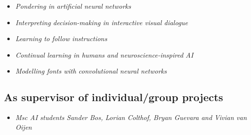 {{{{{{{
{\begin{itemize}
  \item[] \textit{Pondering in artificial neural networks}
\end{itemize}}}

{
{\begin{itemize}
  \item[] \textit{Interpreting decision-making in interactive visual dialogue}
\end{itemize}}}

{
{\begin{itemize}
  \item[] \textit{Learning to follow instructions}
\end{itemize}}}

{
{\begin{itemize}
  \item[] \textit{Continual learning in humans and neuroscience-inspired AI}
\end{itemize}}}

{
{\begin{itemize}
  \item[] \textit{Modelling fonts with convolutional neural networks}
\end{itemize}}}

\vspace{1mm}

\subsection{As supervisor of individual/group projects}
{
{\begin{itemize}
  \item[] \textit{Msc AI students Sander Bos, Lorian Colthof, Bryan Guevara and Vivian van Oijen}
\end{itemize}}}

}}}}}}
